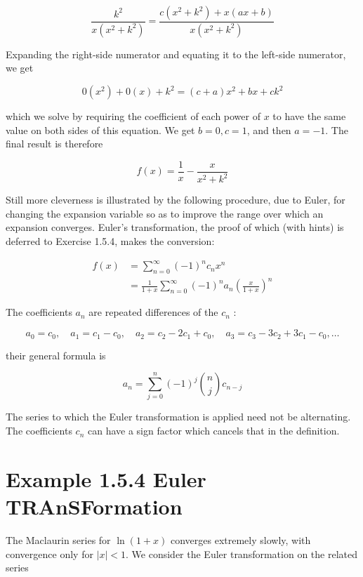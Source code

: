 \documentclass[10pt]{article}
\begin{document}
$$
\frac{k^{2}}{x\left(x^{2}+k^{2}\right)}=\frac{c\left(x^{2}+k^{2}\right)+x(a x+b)}{x\left(x^{2}+k^{2}\right)}
$$

Expanding the right-side numerator and equating it to the left-side numerator, we get

$$
0\left(x^{2}\right)+0(x)+k^{2}=(c+a) x^{2}+b x+c k^{2}
$$

which we solve by requiring the coefficient of each power of $x$ to have the same value on both sides of this equation. We get $b=0, c=1$, and then $a=-1$. The final result is therefore


\begin{equation*}
f(x)=\frac{1}{x}-\frac{x}{x^{2}+k^{2}} \tag{1.85}
\end{equation*}


Still more cleverness is illustrated by the following procedure, due to Euler, for changing the expansion variable so as to improve the range over which an expansion converges. Euler's transformation, the proof of which (with hints) is deferred to Exercise 1.5.4, makes the conversion:


\begin{align*}
f(x) & =\sum_{n=0}^{\infty}(-1)^{n} c_{n} x^{n}  \tag{1.86}\\
& =\frac{1}{1+x} \sum_{n=0}^{\infty}(-1)^{n} a_{n}\left(\frac{x}{1+x}\right)^{n} \tag{1.87}
\end{align*}


The coefficients $a_{n}$ are repeated differences of the $c_{n}$ :

$$
a_{0}=c_{0}, \quad a_{1}=c_{1}-c_{0}, \quad a_{2}=c_{2}-2 c_{1}+c_{0}, \quad a_{3}=c_{3}-3 c_{2}+3 c_{1}-c_{0}, \ldots
$$

their general formula is


\begin{equation*}
a_{n}=\sum_{j=0}^{n}(-1)^{j}\binom{n}{j} c_{n-j} \tag{1.88}
\end{equation*}


The series to which the Euler transformation is applied need not be alternating. The coefficients $c_{n}$ can have a sign factor which cancels that in the definition.

\section*{Example 1.5.4 Euler TRAnSFormation}
The Maclaurin series for $\ln (1+x)$ converges extremely slowly, with convergence only for $|x|<1$. We consider the Euler transformation on the related series
\end{document}
